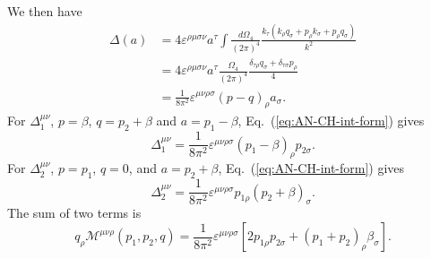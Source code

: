\documentclass[aps,prb,superscriptaddress,nofootinbib]{revtex4}
\begin{document}
We then have
\begin{equation}\label{eq:AN-CH-int-form}
\begin{aligned}
	\Delta(a) 
	&= 4 \varepsilon^{\rho\mu\sigma\nu} a^\tau \int \frac{d \Omega_4}{(2\pi)^4} \frac{k_\tau (k_\rho q_\sigma + p_\rho k_\sigma + p_\rho q_\sigma)}{k^2} \\
	&= 4 \varepsilon^{\rho\mu\sigma\nu} a^\tau \frac{\Omega_4}{(2\pi)^4} \frac{\delta_{\tau\rho}q_\sigma + \delta_{\tau\sigma}p_\rho}{4} \\
	&= \frac{1}{8\pi^2} \varepsilon^{\mu\nu\rho\sigma} (p-q)_\rho a_\sigma.
\end{aligned}
\end{equation}
For $\Delta_{1}^{\mu\nu}$, $p=\beta$, $q=p_2+\beta$ and $a=p_1-\beta$, Eq.~(\ref{eq:AN-CH-int-form}) gives
\begin{equation}
	\Delta^{\mu\nu}_1 = \frac{1}{8\pi^2} \varepsilon^{\mu\nu\rho\sigma} (p_1-\beta)_\rho p_{2\sigma}.
\end{equation}
For $\Delta_2^{\mu\nu}$, $p=p_1$, $q=0$, and $a=p_2+\beta$, Eq.~(\ref{eq:AN-CH-int-form}) gives
\begin{equation}
	\Delta^{\mu\nu}_2 = \frac{1}{8\pi^2} \varepsilon^{\mu\nu\rho\sigma} p_{1\rho}(p_2+\beta)_\sigma.
\end{equation}
The sum of two terms is
\begin{equation}
	q_\rho \mathcal{M}^{\mu\nu\rho}(p_1,p_2,q) = \frac{1}{8\pi^2} \varepsilon^{\mu\nu\rho\sigma} \left[2 p_{1\rho} p_{2\sigma} + (p_1+p_2)_\rho \beta_\sigma \right].
\end{equation}
\end{document}
